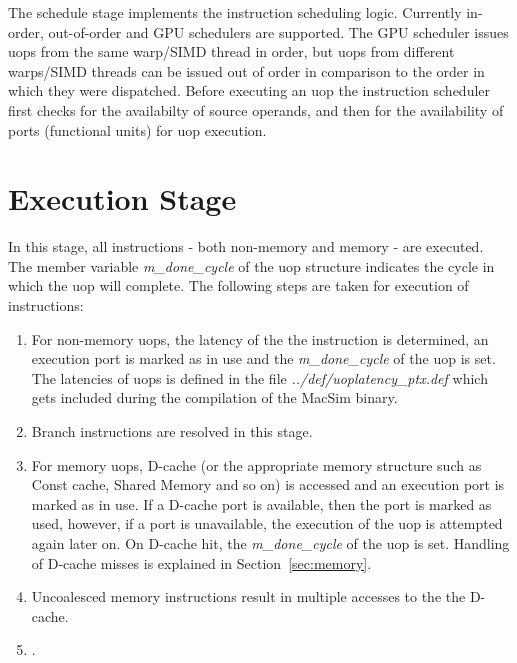 The schedule stage implements the instruction scheduling logic. Currently
in-order, out-of-order and GPU schedulers are supported. The GPU scheduler
issues uops from the same warp/SIMD thread in order, but uops from different
warps/SIMD threads can be issued out of order in comparison to the order in
which they were dispatched. Before executing an uop the instruction scheduler
first checks for the availabilty of source operands, and then for the
availability of ports (functional units) for uop execution. 


\section{Execution Stage}

In this stage, all instructions - both non-memory and memory - are executed.
The member variable \textit{m\_done\_cycle} of the uop structure indicates the
cycle in which the uop will complete. The following steps are taken for
execution of instructions:

\begin{enumerate}

\item For non-memory uops, the latency of the the instruction is determined, an
execution port is marked as in use and the \textit{m\_done\_cycle} of the uop
is set. The latencies of uops is defined in the file
\textit{../def/uoplatency\_ptx.def} which gets included during the compilation
of the MacSim binary. 

\item Branch instructions are resolved in this stage.

\item For memory uops, D-cache (or the appropriate memory structure such as
    Const cache, Shared Memory and so on) is accessed and an execution port is
marked as in use. If a D-cache port is available, then the port is marked as
used, however, if a port is unavailable, the execution of the uop is attempted
again later on. On D-cache hit, the \textit{m\_done\_cycle} of the uop is set.
Handling of D-cache misses is explained in Section~\ref{sec:memory}.


\item Uncoalesced memory instructions result in multiple accesses to the the D-cache.

\item {}.

\end{enumerate}


